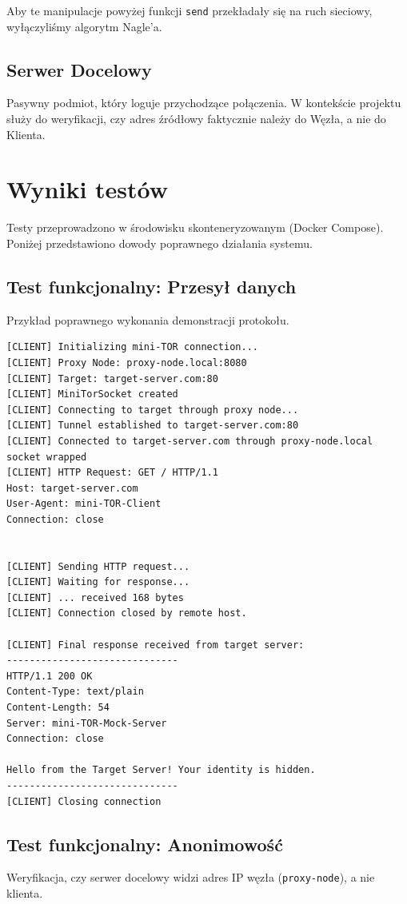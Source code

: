 \documentclass[12pt, a4paper]{article}
\begin{document}
Aby te manipulacje powyżej funkcji \texttt{send} przekładały się na ruch sieciowy, wyłączyliśmy
algorytm Nagle'a.

\subsection{Serwer Docelowy}
Pasywny podmiot, który loguje przychodzące połączenia. W kontekście projektu służy do weryfikacji, czy adres źródłowy faktycznie należy do Węzła, a nie do Klienta.

\section{Wyniki testów}

Testy przeprowadzono w środowisku skonteneryzowanym (Docker Compose). Poniżej przedstawiono dowody poprawnego działania systemu.

\subsection{Test funkcjonalny: Przesył danych}
Przykład poprawnego wykonania demonstracji protokołu.

\begin{lstlisting}[caption=Logi z klienta demonstracyjnego]
[CLIENT] Initializing mini-TOR connection...
[CLIENT] Proxy Node: proxy-node.local:8080
[CLIENT] Target: target-server.com:80
[CLIENT] MiniTorSocket created
[CLIENT] Connecting to target through proxy node...
[CLIENT] Tunnel established to target-server.com:80
[CLIENT] Connected to target-server.com through proxy-node.local
socket wrapped
[CLIENT] HTTP Request: GET / HTTP/1.1
Host: target-server.com
User-Agent: mini-TOR-Client
Connection: close


[CLIENT] Sending HTTP request...
[CLIENT] Waiting for response...
[CLIENT] ... received 168 bytes
[CLIENT] Connection closed by remote host.

[CLIENT] Final response received from target server:
------------------------------
HTTP/1.1 200 OK
Content-Type: text/plain
Content-Length: 54
Server: mini-TOR-Mock-Server
Connection: close

Hello from the Target Server! Your identity is hidden.
------------------------------
[CLIENT] Closing connection
\end{lstlisting}

\subsection{Test funkcjonalny: Anonimowość}
Weryfikacja, czy serwer docelowy widzi adres IP węzła (\texttt{proxy-node}), a nie klienta.
\end{document}
